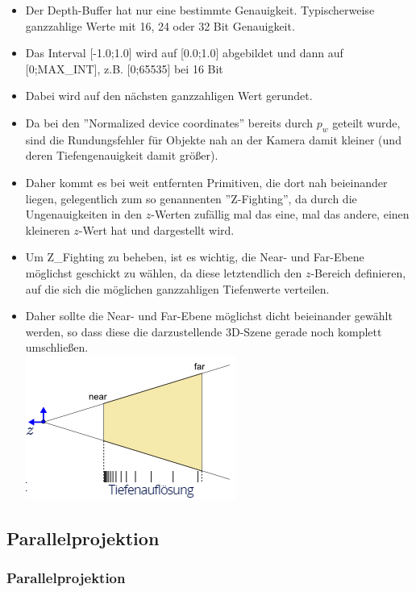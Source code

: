 \documentclass{scrartcl}
\begin{document}
\begin{itemize}
	\item Der Depth-Buffer hat nur eine bestimmte Genauigkeit. Typischerweise ganzzahlige Werte mit 16, 24 oder 32 Bit Genauigkeit.
	\item Das Interval [-1.0;1.0] wird auf [0.0;1.0] abgebildet und dann auf [0;MAX\_INT], z.B. [0;65535] bei 16 Bit
	\item Dabei wird auf den nächsten ganzzahligen Wert gerundet.
	\item Da bei den ''Normalized device coordinates'' bereits durch $p_w$ geteilt wurde, sind die Rundungsfehler für Objekte nah an der Kamera damit kleiner (und deren Tiefengenauigkeit damit größer).
	\item Daher kommt es bei weit entfernten Primitiven, die dort nah beieinander liegen, gelegentlich zum so genannenten ''Z-Fighting'', da durch die Ungenauigkeiten in den $z$-Werten zufällig mal das eine, mal das andere, einen kleineren $z$-Wert hat und dargestellt wird.
	\item Um Z\_Fighting zu beheben, ist es wichtig, die Near- und Far-Ebene möglichst geschickt zu wählen, da diese letztendlich den $z$-Bereich definieren, auf die sich die möglichen ganzzahligen Tiefenwerte verteilen.
	\item Daher sollte die Near- und Far-Ebene möglichst dicht beieinander gewählt werden, so dass diese die darzustellende 3D-Szene gerade noch komplett umschließen. \\
	\includegraphics[scale=0.5]{figures/depthbuffer_resolution.png}
\end{itemize}

\subsection{Parallelprojektion}

\subsubsection{Parallelprojektion}
\end{document}
